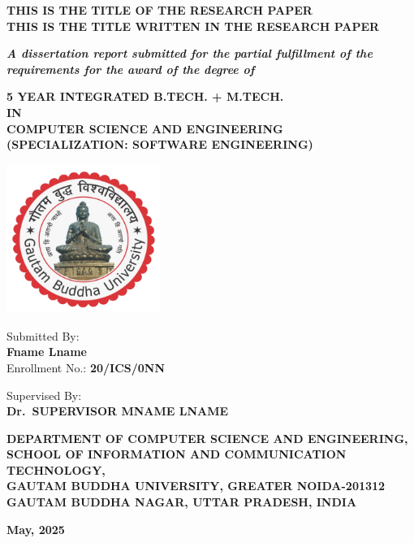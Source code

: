 \begin{titlepage}
	\begin{center}
		{\large\uppercase{
				\textbf{This is the title of the Research Paper\\
					This is the title written in the research paper}
			}}

		{\normalsize\textbf{
				\textit{A dissertation report submitted for the partial
					fulfillment of the requirements for the award of the degree of}
			}}

		\vspace{0.5cm} %

		\uppercase{\textbf{
				5 Year Integrated B.Tech. + M.Tech. \\
				In \\
				Computer Science And Engineering\\
				(Specialization: Software Engineering)
			}}

		\vspace{0.5cm} %

		\includegraphics[width=5cm]{figures/GBU_logo.png} %

		{\large{Submitted By:\\
				\textbf{Fname Lname}\\
				Enrollment No.:\textbf{ 20/ICS/0NN}}}

		\vspace{0.25cm} %

		{\large{Supervised By: \\
				\textbf{Dr.~SUPERVISOR MNAME LNAME}}}

		{\normalsize\uppercase{
				\textbf{Department Of Computer Science And Engineering, \\
					School Of Information And Communication Technology, \\
					Gautam Buddha University, Greater Noida-201312 \\
					Gautam Buddha Nagar, Uttar Pradesh, India}
			}}

		\vfill %

		{\large \textbf{May, 2025}}

	\end{center}
\end{titlepage}
